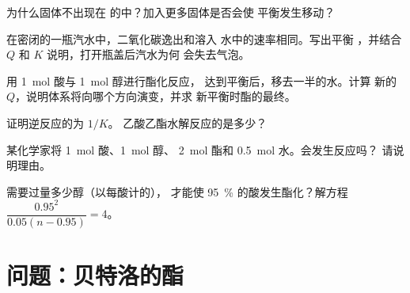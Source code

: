 \begin{exercise}[$\star\star$]\label{exo:g12:equilibrium:10}
为什么固体不出现在
 的中？加入更多固体是否会使
平衡发生移动？
\end{exercise}

\begin{exercise}[$\star\star$]\label{exo:g12:equilibrium:11}
在密闭的一瓶汽水中，二氧化碳逸出和溶入
水中的速率相同。写出平衡
，并结合 $Q$ 和 $K$ 说明，打开瓶盖后汽水为何
会失去气泡。
\end{exercise}

\begin{exercise}[$\star\star\star$]\label{exo:g12:equilibrium:12}
用 \qty{1}{mol} 酸与 \qty{1}{mol} 醇进行酯化反应，
达到平衡后，移去一半的水。计算
新的 $Q$，说明体系将向哪个方向演变，并求
新平衡时酯的最终。
\end{exercise}

\begin{exercise}[$\star\star\star$]\label{exo:g12:equilibrium:13}
证明逆反应的为 $1/K$。
乙酸乙酯水解反应的是多少？
\end{exercise}

\begin{exercise}[$\star\star\star$]\label{exo:g12:equilibrium:14}
某化学家将 \qty{1}{mol} 酸、\qty{1}{mol} 醇、
\qty{2}{mol} 酯和 \qty{0.5}{mol} 水。会发生反应吗？
请说明理由。
\end{exercise}

\begin{exercise}[$\star\star\star$]\label{exo:g12:equilibrium:15}
需要过量多少醇（以每酸计的），
才能使 \qty{95}{\percent} 的酸发生酯化？解方程 $\dfrac{0.95^2}{0.05(n - 0.95)} =
4$。
\end{exercise}

\section{问题：贝特洛的酯}

